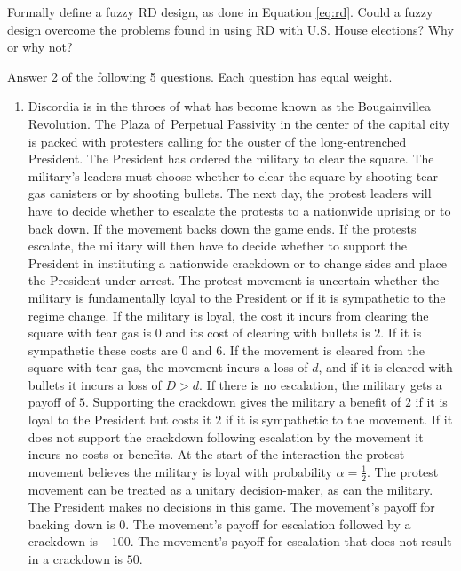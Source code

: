 \documentclass[fleqn,titlepage,12pt]{article}
\makeatletter
\renewcommand{\section}{\@startsection{section}{1}{0em}{\baselineskip}{0.5\baselineskip}{\large\bfseries\large}}
\makeatother
\begin{document}
\begin{enumerate}
Formally define a fuzzy RD design, as done in Equation
\ref{eq:rd}. Could a fuzzy design overcome the problems found in using
RD with U.S. House elections? Why or why not?

\end{enumerate}

\newpage
\section{Formal modeling}

Answer 2 of the following 5 questions. Each question has equal weight.

\begin{enumerate}
\item Discordia is in the throes of what has become known as the
Bougainvillea Revolution. The Plaza of\ Perpetual Passivity in the center of
the capital city is packed with protesters calling for the ouster of the
long-entrenched President. The President has ordered the military to clear
the square. The military's leaders must choose whether to clear the square
by shooting tear gas canisters or by shooting bullets. The next day, the
protest leaders will have to decide whether to escalate the protests to a
nationwide uprising or to back down. If the movement backs down the game
ends. If the protests escalate, the military will then have to decide
whether to support the President in instituting a nationwide crackdown or to
change sides and place the President under arrest. The protest movement is
uncertain whether the military is fundamentally loyal to the President or if
it is sympathetic to the regime change. If the military is loyal, the cost
it incurs from clearing the square with tear gas is $0$ and its cost of
clearing with bullets is $2$. If it is sympathetic these costs are $0$ and $6
$. If the movement is cleared from the square with tear gas, the movement
incurs a loss of $d$, and if it is cleared with bullets it incurs a loss of $%
D>d$. If there is no escalation, the military gets a payoff of $5$.
Supporting the crackdown gives the military a benefit of $2$ if it is loyal
to the President but costs it $2$ if it is sympathetic to the movement. If
it does not support the crackdown following escalation by the movement it
incurs no costs or benefits. At the start of the interaction the protest
movement believes the military is loyal with probability $\alpha =\frac{1}{2}
$. \vspace{0in}The protest movement can be treated as a unitary
decision-maker, as can the military. The President makes no decisions in
this game. The movement's payoff for backing down is $0$. The movement's
payoff for escalation followed by a crackdown is $-100$. The movement's
payoff for escalation that does not result in a crackdown is $50$.


\end{enumerate}
\end{document}
